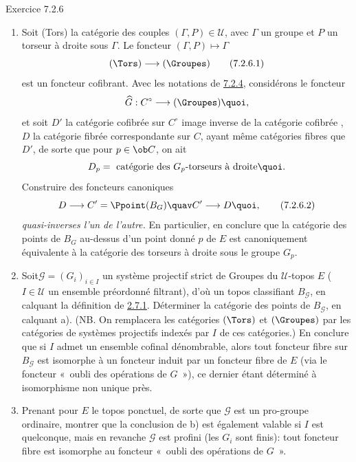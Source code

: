 \documentclass[10pt]{../fichiers-configuration-latex/smfart}
\begin{document}
\begin{enonce*}[remark]{Exercice 7.2.6}
\begin{enumerate}
\renewcommand{\theenumi}{\alph{enumi}}
\renewcommand{\labelenumi}{\theenumi)}
\item Soit (Tors) la catégorie des couples $(\Gamma,P)\in 𝒰$,
avec $\Gamma$ un groupe et $P$ un torseur à droite sous $\Gamma$. Le
foncteur $(\Gamma,P)\mapsto \Gamma$
\begin{equation*}
(\Tors)\longrightarrow (\Groupes)\tag{7.2.6.1}
\end{equation*}
est un foncteur cofibrant. Avec les notations de \hyperref[IV.rem7.2.4]{7.2.4},
considérons le foncteur
$$
\widehat{G}:C^{\circ}\longrightarrow (\Groupes){\quoi},
$$
et soit $D'$ la catégorie cofibrée sur $C^{\circ}$ image inverse de
la catégorie cofibrée , $D$ la
catégorie fibrée
correspondante sur $C$, ayant même catégories fibres que $D'$, de
sorte que pour $p\in \ob C$, on ait
$$
D_p=\mbox{ catégorie des $G_p$-torseurs à droite}{\quoi}.
$$
Construire des foncteurs canoniques
\begin{equation*}
D\longrightarrow C'=\Ppoint(B_G)\quav C'\longrightarrow
D{\quoi},\tag{7.2.6.2}
\end{equation*}
\emph{quasi-inverses l'un de l'autre.} En particulier, en conclure
que la catégorie des points de $B_G$ au-dessus d'un point donné $p$
de $E$ est canoniquement équivalente à la catégorie des torseurs à
droite sous le groupe $G_p$.

\item Soit\pageoriginale $𝒢=(G_i)_{i\in I}$ un système
projectif strict de Groupes du $𝒰$-topos $E$ ($I\in
𝒰$ un ensemble préordonné filtrant), d'où un topos
classifiant $B_{𝒢}$, en calquant la définition de
\hyperref[IV.subsubsec2.7.1]{2.7.1}. Déterminer la catégorie des points de
$B_{𝒢}$, en calquant a). (NB. On remplacera les catégories
$(\Tors)$ et $(\Groupes)$ par les catégories de systèmes projectifs
indexés par $I$ de ces catégories.) En conclure que si $I$ admet un
ensemble cofinal dénombrable, alors tout foncteur fibre sur
$B_{𝒢}$ est isomorphe à un foncteur induit par un foncteur
fibre de $E$ (via le foncteur « oubli des opérations de $G$ »),
ce dernier étant déterminé à isomorphisme non unique près.

\item Prenant pour $E$ le topos ponctuel, de sorte que $𝒢$ est
un pro-groupe ordinaire, montrer que la conclusion de b) est
également valable si $I$ est quelconque, mais en revanche
$𝒢$ est profini (\ie les $G_i$ sont finis): tout foncteur
fibre est isomorphe au foncteur « oubli des opérations de $G$ ».


\end{enumerate}
\end{enonce*}
\end{document}
